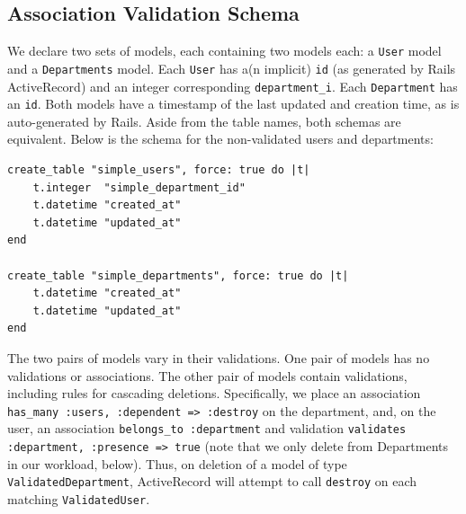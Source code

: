 \subsection{Association Validation Schema}
\label{sec:appendix-association-schema}

We declare two sets of models, each containing two models each: a \texttt{User} model and a \texttt{Departments} model. Each \texttt{User} has a(n implicit) \texttt{id} (as generated by Rails ActiveRecord) and an integer corresponding \texttt{department\_i}. Each \texttt{Department} has an \texttt{id}. Both models have a timestamp of the last updated and creation time, as is auto-generated by Rails. Aside from the table names, both schemas are equivalent. Below is the schema for the non-validated users and departments:\vspace{-.5em}
\begin{lstlisting}
create_table "simple_users", force: true do |t|
    t.integer  "simple_department_id"
    t.datetime "created_at"
    t.datetime "updated_at"
end

create_table "simple_departments", force: true do |t|
    t.datetime "created_at"
    t.datetime "updated_at"
end
\end{lstlisting}\vspace{-.5em}
The two pairs of models vary in their validations. One pair of models has no validations or associations. The other pair of models contain validations, including rules for cascading deletions. Specifically, we place an association \texttt{has\_many :users, :dependent => :destroy} on the department, and, on the user, an association \texttt{belongs\_to :department} and validation \texttt{validates :department, :presence => true} (note that we only delete from Departments in our workload, below). Thus, on deletion of a model of type \texttt{ValidatedDepartment}, ActiveRecord will attempt to call \texttt{destroy} on each matching \texttt{ValidatedUser}.

